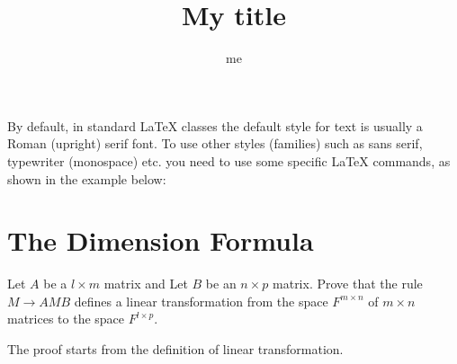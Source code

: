 \documentclass{mypuzzle}
\title{My title}
\author{me}
\begin{document}
\maketitle

By default, in standard LaTeX classes the default style for text is usually a
Roman (upright) serif font. To use other styles (families) such as sans serif,
typewriter (monospace) etc. you need to use some specific LaTeX commands, as
shown in the example below:

\section{The Dimension Formula}
\begin{qst}
  Let $A$ be a $l \times m$ matrix and Let $B$ be an $n \times p$ matrix. Prove
  that the rule $M \to AMB$ defines a linear transformation from the space
  $F^{m \times n}$ of $m \times n$ matrices to the space $F^{l \times p}$.
\end{qst}
\begin{prf}
  The proof starts from the definition of linear transformation.
\end{prf}
\end{document}
